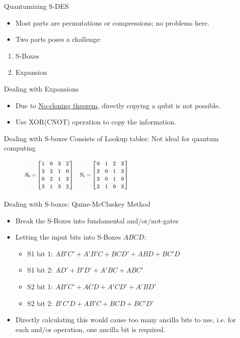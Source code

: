 \documentclass{beamer}
\begin{document}
    \begin{frame}{Quantumizing S-DES}
        \begin{itemize}
            \item Most parts are permutations or compressions; no problems here.
            \item Two parts poses a challenge:
        \end{itemize}
        \begin{enumerate}
            \item S-Boxes
            \item Expansion
        \end{enumerate}
    \end{frame}

    \begin{frame}{Dealing with Expansions}
        \begin{itemize}
            \item Due to \href{https://en.wikipedia.org/wiki/No-cloning_theorem}{No-cloning theorem}, directly copying a qubit is not possible.
            \item Use XOR(CNOT) operation to copy the information.
        \end{itemize}
    \end{frame}

    \begin{frame}{Dealing with S-boxes}
        Consists of Lookup tables: Not ideal for quantum computing
        \begin{figure}[h]
            \centering
            \includegraphics[width=0.5\textwidth]{./Images/sbox.png}
        \end{figure}
    \end{frame}

    \begin{frame}{Dealing with S-boxes: Quine-McCluskey Method}
        \begin{itemize}
            \item Break the S-Boxes into fundamental and/or/not-gates
            \item Letting the input bits into S-Boxes $ABCD$:
            \begin{itemize}
                \item S1 bit 1: $AB'C'+A'B'C+BCD'+ABD+BC'D$
                \item S1 bit 2: $AD'+B'D'+A'BC+ABC'$
                \item S2 bit 1: $AB'C'+ACD+A'CD'+A'BD'$
                \item S2 bit 2: $B'C'D+AB'C+BCD+BC'D'$
            \end{itemize}
            \item Directly calculating this would cause too many ancilla bits to use, i.e. for each and/or operation, one ancilla bit is required.
        \end{itemize}
    \end{frame}
\end{document}
